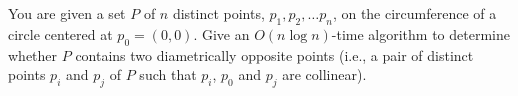 You are given a set $P$ of $n$ distinct points, $p_1,p_2,\ldots  p_n$,
on the circumference of a circle centered at $p_0=(0,0)$.  Give an
$O(n \log  n)$-time algorithm to determine whether $P$ contains two
diametrically opposite points (i.e., a pair of distinct points $p_i$
and $p_j$ of $P$ such that $p_i$, $p_0$ and $p_j$ are collinear).


